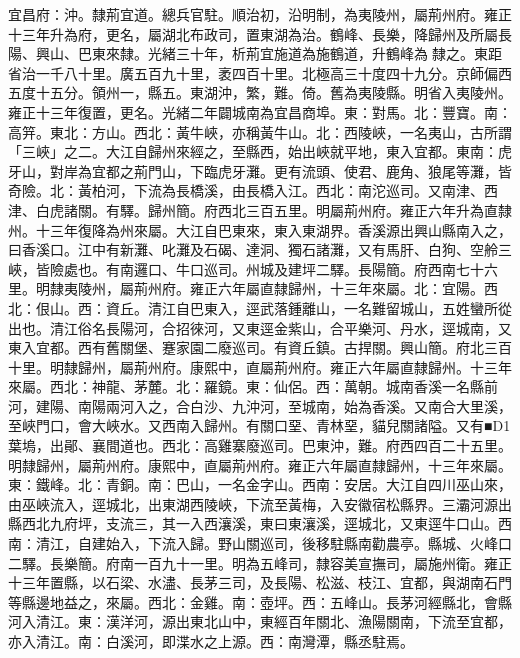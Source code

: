 \begin{pinyinscope}
宜昌府：沖。隸荊宜道。總兵官駐。順治初，沿明制，為夷陵州，屬荊州府。雍正十三年升為府，更名，屬湖北布政司，置東湖為治。鶴峰、長樂，降歸州及所屬長陽、興山、巴東來隸。光緒三十年，析荊宜施道為施鶴道，升鶴峰為隸之。東距省治一千八十里。廣五百九十里，袤四百十里。北極高三十度四十九分。京師偏西五度十五分。領州一，縣五。東湖沖，繁，難。倚。舊為夷陵縣。明省入夷陵州。雍正十三年復置，更名。光緒二年闢城南為宜昌商埠。東：對馬。北：豐寶。南：高笄。東北：方山。西北：黃牛峽，亦稱黃牛山。北：西陵峽，一名夷山，古所謂「三峽」之二。大江自歸州來經之，至縣西，始出峽就平地，東入宜都。東南：虎牙山，對岸為宜都之荊門山，下臨虎牙灘。更有流頭、使君、鹿角、狼尾等灘，皆奇險。北：黃柏河，下流為長橋溪，由長橋入江。西北：南沱巡司。又南津、西津、白虎諸關。有驛。歸州簡。府西北三百五里。明屬荊州府。雍正六年升為直隸州。十三年復降為州來屬。大江自巴東來，東入東湖界。香溪源出興山縣南入之，曰香溪口。江中有新灘、叱灘及石碣、達洞、獨石諸灘，又有馬肝、白狗、空舲三峽，皆險處也。有南邏口、牛口巡司。州城及建坪二驛。長陽簡。府西南七十六里。明隸夷陵州，屬荊州府。雍正六年屬直隸歸州，十三年來屬。北：宜陽。西北：佷山。西：資丘。清江自巴東入，逕武落鍾離山，一名難留城山，五姓蠻所從出也。清江俗名長陽河，合招徠河，又東逕金紫山，合平樂河、丹水，逕城南，又東入宜都。西有舊關堡、蹇家園二廢巡司。有資丘鎮。古捍關。興山簡。府北三百十里。明隸歸州，屬荊州府。康熙中，直屬荊州府。雍正六年屬直隸歸州。十三年來屬。西北：神龍、茅麓。北：羅鏡。東：仙侶。西：萬朝。城南香溪一名縣前河，建陽、南陽兩河入之，合白沙、九沖河，至城南，始為香溪。又南合大里溪，至峽門口，會大峽水。又西南入歸州。有關口堊、青林堊，貓兒關諸隘。又有■D1葉塢，出鄖、襄間道也。西北：高雞寨廢巡司。巴東沖，難。府西四百二十五里。明隸歸州，屬荊州府。康熙中，直屬荊州府。雍正六年屬直隸歸州，十三年來屬。東：鐵峰。北：青銅。南：巴山，一名金字山。西南：安居。大江自四川巫山來，由巫峽流入，逕城北，出東湖西陵峽，下流至黃梅，入安徽宿松縣界。三灞河源出縣西北九府坪，支流三，其一入西瀼溪，東曰東瀼溪，逕城北，又東逕牛口山。西南：清江，自建始入，下流入歸。野山關巡司，後移駐縣南勸農亭。縣城、火峰口二驛。長樂簡。府南一百九十一里。明為五峰司，隸容美宣撫司，屬施州衛。雍正十三年置縣，以石梁、水濜、長茅三司，及長陽、松滋、枝江、宜都，與湖南石門等縣邊地益之，來屬。西北：金雞。南：壺坪。西：五峰山。長茅河經縣北，會縣河入清江。東：漢洋河，源出東北山中，東經百年關北、漁陽關南，下流至宜都，亦入清江。南：白溪河，即渫水之上源。西：南灣潭，縣丞駐焉。


\end{pinyinscope}
